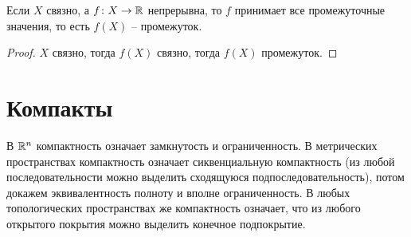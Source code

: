 \begin{theorem}
    Если $X$ связно, а $f\colon X\to \mathbb R$ непрерывна, то $f$ принимает все промежуточные значения, то есть $f(X)$ -- промежуток.
\end{theorem}
\begin{proof}
    $X$ связно, тогда $f(X)$ связно, тогда $f(X)$ промежуток.
\end{proof}

\section{Компакты}
В $\mathbb R^n$ компактность означает замкнутость и ограниченность. В метрических пространствах компактность означает сиквенциальную компактность (из любой последовательности можно выделить сходящуюся подпоследовательность), потом докажем эквивалентность полноту и вполне ограниченность. В любых топологических пространствах же компактность означает, что из любого открытого покрытия можно выделить конечное подпокрытие.  